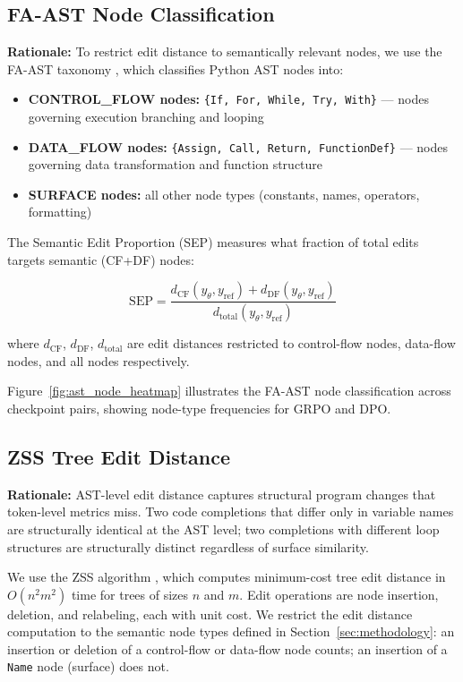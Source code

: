 \subsection{FA-AST Node Classification}

\textbf{Rationale:} To restrict edit distance to semantically relevant nodes, we use
the FA-AST taxonomy \cite{Wang2020Detecting}, which classifies Python AST nodes into:

\begin{itemize}
  \item \textbf{CONTROL\_FLOW nodes:} \texttt{\{If, For, While, Try, With\}} --- nodes governing execution branching and looping
  \item \textbf{DATA\_FLOW nodes:} \texttt{\{Assign, Call, Return, FunctionDef\}} --- nodes governing data transformation and function structure
  \item \textbf{SURFACE nodes:} all other node types (constants, names, operators, formatting)
\end{itemize}

The Semantic Edit Proportion (SEP) measures what fraction of total edits targets
semantic (CF+DF) nodes:

\begin{equation}
\text{SEP} = \frac{d_\text{CF}(y_\theta, y_\text{ref}) + d_\text{DF}(y_\theta, y_\text{ref})}{d_\text{total}(y_\theta, y_\text{ref})}
\label{eq:sep}
\end{equation}

where $d_\text{CF}$, $d_\text{DF}$, $d_\text{total}$ are edit distances restricted
to control-flow nodes, data-flow nodes, and all nodes respectively.

Figure~\ref{fig:ast_node_heatmap} illustrates the FA-AST node classification
across checkpoint pairs, showing node-type frequencies for GRPO and DPO.

\subsection{ZSS Tree Edit Distance}

\textbf{Rationale:} AST-level edit distance captures structural program changes that
token-level metrics miss. Two code completions that differ only in variable names
are structurally identical at the AST level; two completions with different loop
structures are structurally distinct regardless of surface similarity.

We use the ZSS algorithm \cite{Zhang1989Simple}, which computes minimum-cost
tree edit distance in $O(n^2 m^2)$ time for trees of sizes $n$ and $m$. Edit
operations are node insertion, deletion, and relabeling, each with unit cost.
We restrict the edit distance computation to the semantic node types
defined in Section~\ref{sec:methodology}: an insertion or deletion of a control-flow or data-flow
node counts; an insertion of a \texttt{Name} node (surface) does not.

